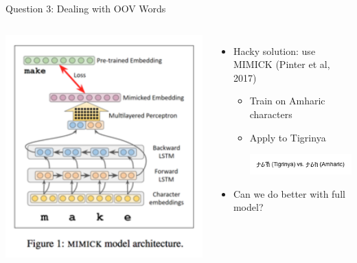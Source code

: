 \documentclass[compress]{beamer}
\begin{document}
\begin{frame}{Question 3: Dealing with OOV Words}
  \begin{columns}
    \begin{center}
      \includegraphics[width=.9\linewidth]{clwe/mimick}
    \end{center}
  \begin{itemize}
    \item Hacky solution: use MIMICK (Pinter et al, 2017)
      \begin{itemize}
        \item Train on Amharic characters
        \item Apply to Tigrinya
          \begin{center}
            \includegraphics[width=.9\linewidth]{clwe/amharic}
          \end{center}
      \end{itemize}
    \item Can we do better with full model?
  \end{itemize}
  \end{columns}
\end{frame}
\end{document}
